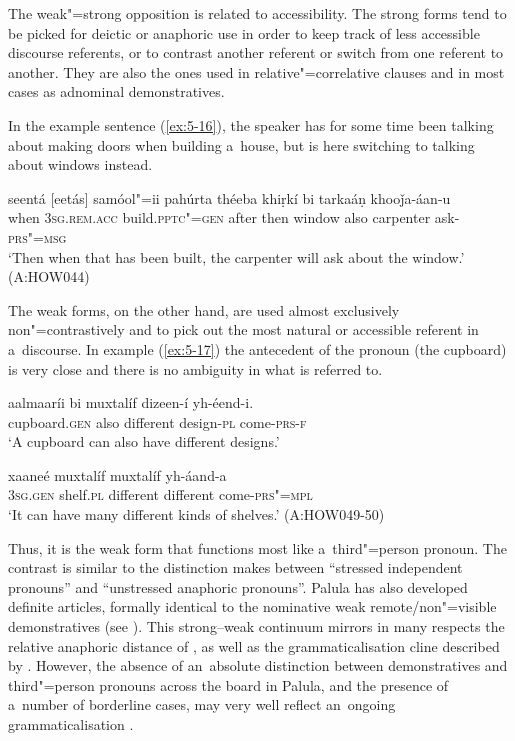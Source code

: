 The weak"=strong opposition is related to accessibility. The strong forms tend to be picked for deictic or anaphoric use in order to keep track of less accessible discourse referents, or to contrast another referent or switch from one referent to another. They are also the ones used in relative"=correlative clauses and in most cases as adnominal demonstratives. 


In the example sentence (\ref{ex:5-16}), the speaker has for some time been talking about making doors when building a~house, but is here switching to talking about windows instead.


\begin{exe}
\ex
\label{ex:5-16}
\gll seentá [eetás] samóol"=ii pahúrta théeba khiṛkí bi tarkaáṇ
khooǰa-áan-u  \\
when \textsc{3sg}.\textsc{rem.acc} build.\textsc{pptc"=gen} after then window also carpenter ask-\textsc{prs"=msg} \\
\glt `Then when that has been built, the carpenter will ask about the window.' (A:HOW044)
\end{exe}

The weak forms, on the other hand, are used almost exclusively non"=contrastively and to pick out the
most natural or accessible referent in a~discourse. In example (\ref{ex:5-17}) the antecedent of the pronoun
(the cupboard) is very close and there is no ambiguity in what is referred to.

\begin{exe}
\ex
\label{ex:5-17}
\gll aalmaaríi bi muxtalíf dizeen-í yh-éend-i. \\
cupboard.\textsc{gen} also different design-\textsc{pl} come-\textsc{prs-f} \\
\glt `A cupboard can also have different designs.' 

\gll [tasíi] xaaneé muxtalíf muxtalíf yh-áand-a \\
\textsc{3sg.gen} shelf.\textsc{pl} different different come-\textsc{prs"=mpl} \\
\glt `It can have many different kinds of shelves.' (A:HOW049-50)
\end{exe}

Thus, it is the weak form that functions most like a~third"=person pronoun. The contrast is similar to the distinction \citet[417--419]{givon2001a} makes between ``stressed independent pronouns'' and ``unstressed anaphoric pronouns''. Palula has also developed definite articles, formally identical to the nominative weak remote/non"=visible demonstratives (see ). This strong--weak continuum mirrors in many respects the relative anaphoric distance of \citet[419]{givon2001a}, as well as the grammaticalisation cline described by \citet[432]{diessel2006}. However, the absence of an~absolute distinction between demonstratives and third"=person pronouns across the board in Palula, and the presence of a~number of borderline cases, may very well reflect an~ongoing grammaticalisation \citep[213]{himmelmann1996}.


